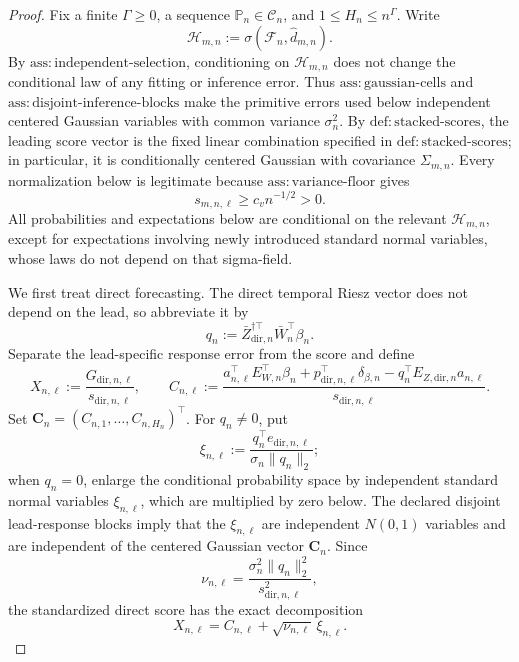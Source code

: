 \documentclass{article}
\begin{document}
\begin{proof}
Fix a finite \(\Gamma\ge0\), a sequence \(\mathbb P_n\in\mathcal C_n\), and \(1\le H_n\le n^\Gamma\).  Write
\[
 \mathcal H_{m,n}:=\sigma(\mathcal F_n,\widehat d_{m,n}).
\]
By \(\mathrm{ass{:}independent\mbox{-}selection}\), conditioning on \(\mathcal H_{m,n}\) does not change the conditional law of any fitting or inference error.  Thus \(\mathrm{ass{:}gaussian\mbox{-}cells}\) and \(\mathrm{ass{:}disjoint\mbox{-}inference\mbox{-}blocks}\) make the primitive errors used below independent centered Gaussian variables with common variance \(\sigma_n^2\).  By \(\mathrm{def{:}stacked\mbox{-}scores}\), the leading score vector is the fixed linear combination specified in \(\mathrm{def{:}stacked\mbox{-}scores}\); in particular, it is conditionally centered Gaussian with covariance \(\Sigma_{m,n}\).  Every normalization below is legitimate because \(\mathrm{ass{:}variance\mbox{-}floor}\) gives
\[
 s_{m,n,\ell}\ge c_v n^{-1/2}>0.
 \tag{1}
\]
All probabilities and expectations below are conditional on the relevant \(\mathcal H_{m,n}\), except for expectations involving newly introduced standard normal variables, whose laws do not depend on that sigma-field.

We first treat direct forecasting.  The direct temporal Riesz vector does not depend on the lead, so abbreviate it by
\[
 q_n:=\bar Z_{\mathrm{dir},n}^{\dagger\top}\bar W_n^{\top}\beta_n.
\]
Separate the lead-specific response error from the score and define
\[
 X_{n,\ell}:=\frac{G_{\mathrm{dir},n,\ell}}{s_{\mathrm{dir},n,\ell}},
 \qquad
 C_{n,\ell}:=\frac{
 a_{n,\ell}^{\top}E_{W,n}^{\top}\beta_n
 +p_{\mathrm{dir},n,\ell}^{\top}\delta_{\beta,n}
 -q_n^{\top}E_{Z,\mathrm{dir},n}a_{n,\ell}}
 {s_{\mathrm{dir},n,\ell}}.
\]
Set \(\boldsymbol C_n=(C_{n,1},\ldots,C_{n,H_n})^\top\).
For \(q_n\ne0\), put
\[
 \xi_{n,\ell}:=\frac{q_n^{\top}e_{\mathrm{dir},n,\ell}}
 {\sigma_n\|q_n\|_2};
\]
when \(q_n=0\), enlarge the conditional probability space by independent standard normal variables \(\xi_{n,\ell}\), which are multiplied by zero below.  The declared disjoint lead-response blocks imply that the \(\xi_{n,\ell}\) are independent \(N(0,1)\) variables and are independent of the centered Gaussian vector \(\boldsymbol C_n\).  Since
\[
 \nu_{n,\ell}
 =\frac{\sigma_n^2\|q_n\|_2^2}{s_{\mathrm{dir},n,\ell}^2},
\]
the standardized direct score has the exact decomposition
\[
 X_{n,\ell}=C_{n,\ell}+\sqrt{\nu_{n,\ell}}\,\xi_{n,\ell}.
 \tag{2}
\]


\end{proof}
\end{document}
